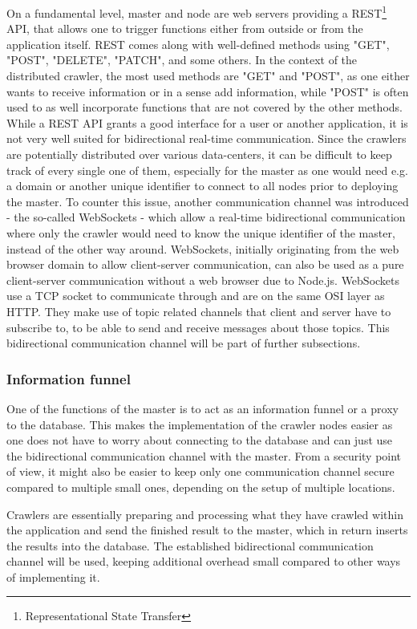 On a fundamental level, master and node are web servers providing a REST\footnote{Representational State Transfer} API, that allows one to trigger functions either from outside or from the application itself. REST comes along with well-defined methods using "GET", "POST", "DELETE", "PATCH", and some others. In the context of the distributed crawler, the most used methods are "GET" and "POST", as one either wants to receive information or in a sense add information, while "POST" is often used to as well incorporate functions that are not covered by the other methods.
While a REST API grants a good interface for a user or another application, it is not very well suited for bidirectional real-time communication. Since the crawlers are potentially distributed over various data-centers, it can be difficult to keep track of every single one of them, especially for the master as one would need e.g. a domain or another unique identifier to connect to all nodes prior to deploying the master. To counter this issue, another communication channel was introduced - the so-called WebSockets - which allow a real-time bidirectional communication where only the crawler would need to know the unique identifier of the master, instead of the other way around. WebSockets, initially originating from the web browser domain to allow client-server communication, can also be used as a pure client-server communication without a web browser due to Node.js. WebSockets use a TCP socket to communicate through and are on the same OSI layer as HTTP. They make use of topic related channels that client and server have to subscribe to, to be able to send and receive messages about those topics. This bidirectional communication channel will be part of further subsections.

\subsubsection{Information funnel}
One of the functions of the master is to act as an information funnel or a proxy to the database. This makes the implementation of the crawler nodes easier as one does not have to worry about connecting to the database and can just use the bidirectional communication channel with the master. From a security point of view, it might also be easier to keep only one communication channel secure compared to multiple small ones, depending on the setup of multiple locations.

Crawlers are essentially preparing and processing what they have crawled within the application and send the finished result to the master, which in return inserts the results into the database. The established bidirectional communication channel will be used, keeping additional overhead small compared to other ways of implementing it.

